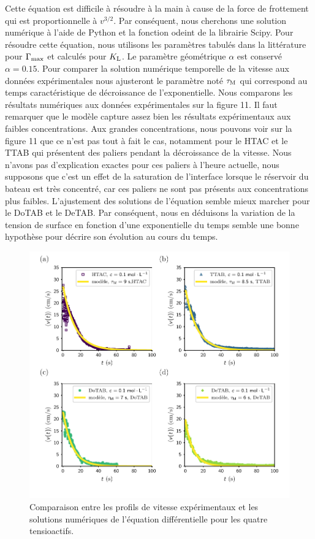 \documentclass[french, 10pt]{article}
\begin{document}
Cette équation est difficile à résoudre à la main à cause de la force de frottement qui est proportionnelle à $v^{3/2}$.  Par conséquent, nous cherchons une solution numérique à l'aide de Python et la fonction odeint de la librairie Scipy. Pour résoudre cette équation, nous utilisons les paramètres tabulés dans la littérature pour $\Gamma_{\rm max}$ et calculés pour $K_{\rm L}$. Le paramètre géométrique $\alpha$ est conservé $\alpha= 0.15$. Pour comparer la solution numérique temporelle de la vitesse aux données expérimentales nous ajusteront le paramètre noté $\tau_{\rm M}$ qui correspond au temps caractéristique de décroissance de l'exponentielle. Nous comparons les résultats numériques aux données expérimentales sur la figure 11. Il faut remarquer que le modèle capture assez bien les résultats expérimentaux aux faibles concentrations. Aux grandes concentrations, nous pouvons voir sur la figure 11 que ce n'est pas tout à fait le cas, notamment pour le HTAC et le TTAB qui présentent des paliers pendant la décroissance de la vitesse. Nous n'avons pas d'explication exactes pour ces paliers à l'heure actuelle, nous supposons que c'est un effet de la saturation de l'interface lorsque le réservoir du bateau est très concentré, car ces paliers ne sont pas présents aux concentrations plus faibles. L'ajustement des solutions de l'équation semble mieux marcher pour le DoTAB et le DeTAB. Par conséquent, nous en déduisons la variation de la tension de surface en fonction d'une exponentielle du temps semble une bonne hypothèse pour décrire son évolution au cours du temps.\medskip


\begin{figure}[!ht]
  \centering
  \includegraphics{Deceleration_vitesse_faible_concentration_modele.pdf}
  \caption{Comparaison entre les profils de vitesse expérimentaux et les solutions numériques de l'équation différentielle pour les quatre tensioactifs.}
  \label{fig:decroissancemodele}
\end{figure}
\end{document}
